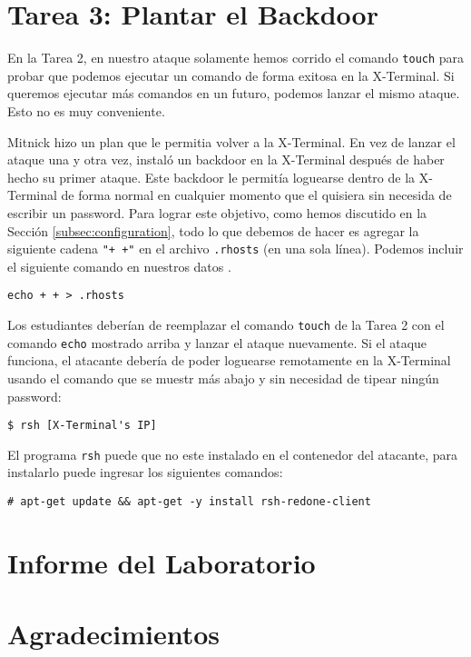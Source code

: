 \section{Tarea 3: Plantar el Backdoor}

En la Tarea 2, en nuestro ataque solamente hemos corrido el comando \texttt{touch} para probar que podemos ejecutar un comando de forma exitosa en la X-Terminal. Si queremos ejecutar más comandos en un futuro, podemos lanzar el mismo ataque. Esto no es muy conveniente.

Mitnick hizo un plan que le permitia volver a la X-Terminal. En vez de lanzar el ataque una y otra vez, instaló un backdoor en la X-Terminal después de haber hecho su primer ataque.
Este backdoor le permitía loguearse dentro de la X-Terminal de forma normal en cualquier momento que el quisiera sin necesida de escribir un password.
Para lograr este objetivo, como hemos discutido en la Sección \ref{subsec:configuration}, todo lo que debemos de hacer es agregar la siguiente cadena \texttt{"+ +"} en el archivo \texttt{.rhosts} (en una sola línea). Podemos incluir el siguiente comando en nuestros datos \rsh.

\begin{lstlisting}
echo + + > .rhosts
\end{lstlisting}

Los estudiantes deberían de reemplazar el comando  \texttt{touch} de la Tarea 2 con el comando \texttt{echo} mostrado arriba y lanzar el ataque nuevamente.
Si el ataque funciona, el atacante debería de poder loguearse remotamente en la X-Terminal usando el comando que se muestr más abajo y sin necesidad de tipear ningún password:

\begin{lstlisting}
$ rsh [X-Terminal's IP]
\end{lstlisting}

El programa \texttt{rsh} puede que no este instalado en el contenedor del atacante, para instalarlo puede ingresar los siguientes comandos:


\begin{lstlisting}
# apt-get update && apt-get -y install rsh-redone-client 
\end{lstlisting}


\section{Informe del Laboratorio}




\section*{Agradecimientos}










